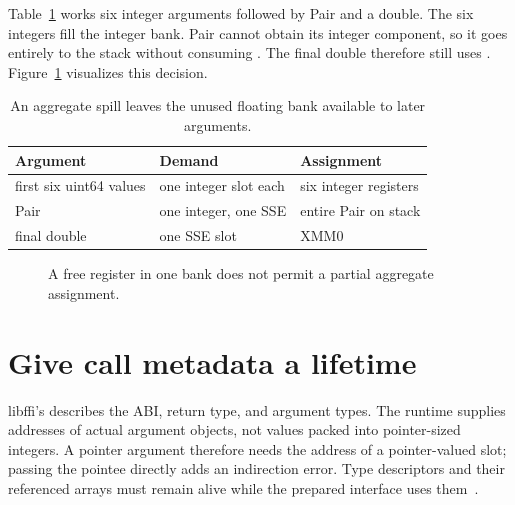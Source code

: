 Table~\ref{tab:ch70-pressure} works six integer arguments followed by Pair and a double.
The six integers fill the integer bank.
Pair cannot obtain its integer component, so it goes entirely to the stack without consuming .
The final double therefore still uses .
Figure~\ref{fig:ch70-banks} visualizes this decision.

\begin{table}[htbp]
\caption{An aggregate spill leaves the unused floating bank available to later arguments.}
\label{tab:ch70-pressure}
\centering
\begin{tabular}{lll}
\toprule
Argument & Demand & Assignment \\
\midrule
first six uint64 values & one integer slot each & six integer registers \\
Pair & one integer, one SSE & entire Pair on stack \\
final double & one SSE slot & XMM0 \\
\bottomrule
\end{tabular}
\end{table}

\begin{figure}[htbp]
\centering
{}
\caption{A free register in one bank does not permit a partial aggregate assignment.}
\label{fig:ch70-banks}
\end{figure}

\section{Give call metadata a lifetime}
\label{sec:ch70-libffi}
libffi's  describes the ABI, return type, and argument types.
The runtime supplies addresses of actual argument objects, not values packed into pointer-sized integers.
A pointer argument therefore needs the address of a pointer-valued slot; passing the pointee directly adds an indirection error.
Type descriptors and their referenced arrays must remain alive while the prepared interface uses them~\cite{libffi-2026-manual}.

